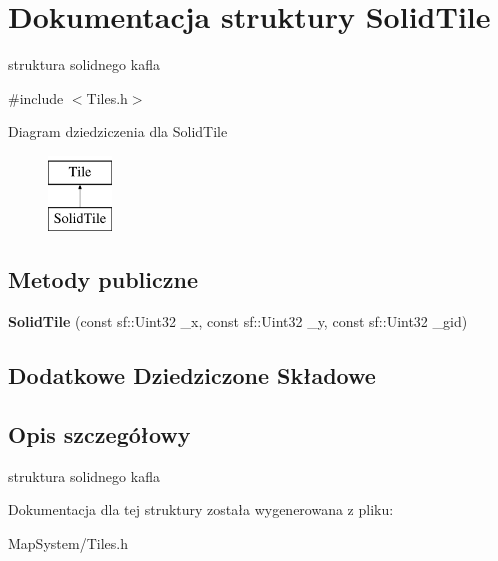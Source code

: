 \hypertarget{struct_solid_tile}{\section{Dokumentacja struktury Solid\-Tile}
\label{struct_solid_tile}
}


struktura solidnego kafla  




{\ttfamily \#include $<$Tiles.\-h$>$}

Diagram dziedziczenia dla Solid\-Tile\begin{figure}[H]
\begin{center}
\leavevmode
\includegraphics[height=2.000000cm]{struct_solid_tile}
\end{center}
\end{figure}
\subsection*{Metody publiczne}
\begin{DoxyCompactItemize}
\item 
\hypertarget{struct_solid_tile_a64d7a3406a34ddbee80db67e7f0ea508}{{\bfseries Solid\-Tile} (const sf\-::\-Uint32 \-\_\-x, const sf\-::\-Uint32 \-\_\-y, const sf\-::\-Uint32 \-\_\-gid)}\label{struct_solid_tile_a64d7a3406a34ddbee80db67e7f0ea508}

\end{DoxyCompactItemize}
\subsection*{Dodatkowe Dziedziczone Składowe}


\subsection{Opis szczegółowy}
struktura solidnego kafla 

Dokumentacja dla tej struktury została wygenerowana z pliku\-:\begin{DoxyCompactItemize}
\item 
Map\-System/Tiles.\-h\end{DoxyCompactItemize}
